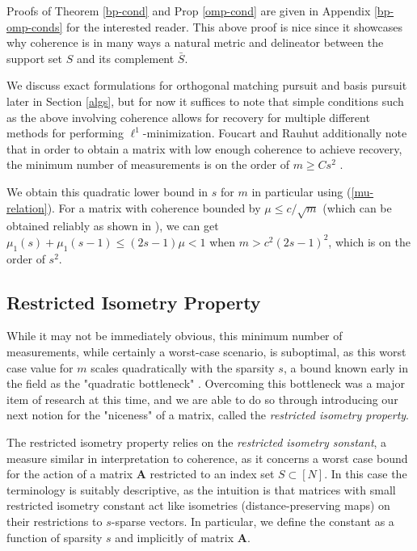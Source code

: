 \documentclass[12pt,a4paper]{amsart}
\numberwithin{equation}{section}
\theoremstyle{plain}
\theoremstyle{definition}
\newcommand{\bdA}{\mathbf{A}}
\begin{document}
Proofs of Theorem \ref{bp-cond} and Prop \ref{omp-cond} are given in Appendix \ref{bp-omp-conds} for the interested reader. This above proof is nice since it showcases why coherence is in many ways a natural metric and delineator between the support set $S$ and its complement $\bar S$.

We discuss exact formulations for orthogonal matching pursuit and basis pursuit later in Section \ref{algs}, but for now it suffices to note that simple conditions such as the above involving coherence allows for recovery for multiple different methods for performing $\ell^1$-minimization. Foucart and Rauhut additionally note that in order to obtain a matrix with low enough coherence to achieve recovery, the minimum number of measurements is on the order of $m\geq Cs^2$ \cite{fou-rau}.

We obtain this quadratic lower bound in $s$ for $m$ in particular using (\ref{mu-relation}). For a matrix with coherence bounded by $\mu\leq c/\sqrt{m}$ (which can be obtained reliably as shown in \cite{fou-rau}), we can get $\mu_1(s)+\mu_1(s-1)\leq(2s-1)\mu<1$ when $m>c^2(2s-1)^2$, which is on the order of $s^2$.

\subsection{Restricted Isometry Property}\label{rip-section}

While it may not be immediately obvious, this minimum number of measurements, while certainly a worst-case scenario, is suboptimal, as this worst case value for $m$ scales quadratically with the sparsity $s$, a bound known early in the field as the "quadratic bottleneck" \cite{fou-rau}. Overcoming this bottleneck was a major item of research at this time, and we are able to do so through introducing our next notion for the "niceness" of a matrix, called the \textit{restricted isometry property}. 

The restricted isometry property relies on the \textit{restricted isometry sonstant}, a measure similar in interpretation to coherence, as it concerns a worst case bound for the action of a matrix $\bdA$ restricted to an index set $S\subset[N]$. In this case the terminology is suitably descriptive, as the intuition is that matrices with small restricted isometry constant act like isometries (distance-preserving maps) on their restrictions to $s$-sparse vectors. In particular, we define the constant as a function of sparsity $s$ and implicitly of matrix $\bdA$.
\end{document}
